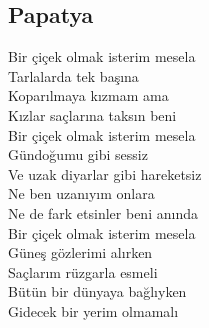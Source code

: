 \subsection{Papatya}

Bir çiçek olmak isterim mesela \\
Tarlalarda tek başına \\
Koparılmaya kızmam ama \\
Kızlar saçlarına taksın beni \\

\noindent\newline
Bir çiçek olmak isterim mesela \\
Gündoğumu gibi sessiz \\
Ve uzak diyarlar gibi hareketsiz \\
Ne ben uzanıyım onlara \\
Ne de fark etsinler beni anında \\

\noindent\newline
Bir çiçek olmak isterim mesela \\
Güneş gözlerimi alırken \\
Saçlarım rüzgarla esmeli \\
Bütün bir dünyaya bağlıyken \\
Gidecek bir yerim olmamalı \\